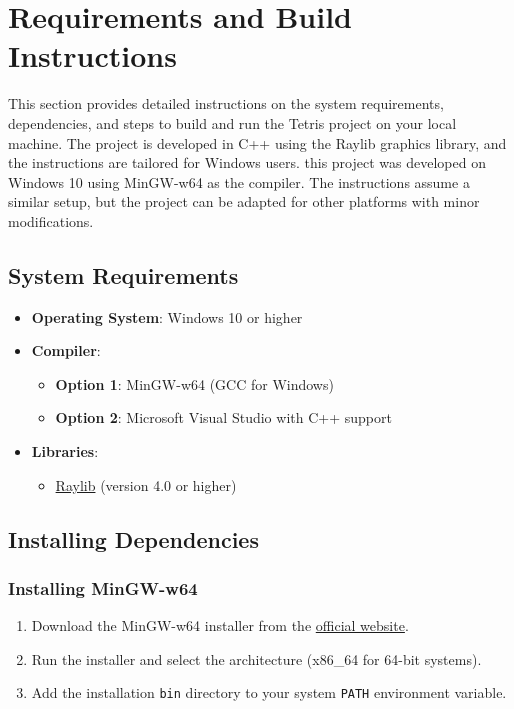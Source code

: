 \documentclass{article}
\begin{document}
\section{Requirements and Build Instructions}

This section provides detailed instructions on the system requirements, dependencies, and steps to build and run the Tetris project on your local machine. The project is developed in C++ using the Raylib graphics library, and the instructions are tailored for Windows users.
this project was developed on Windows 10 using MinGW-w64 as the compiler. The instructions assume a similar setup, but the project can be adapted for other platforms with minor modifications.
\subsection{System Requirements}

\begin{itemize}
    \item \textbf{Operating System}: Windows 10 or higher
    \item \textbf{Compiler}:
    \begin{itemize}
        \item \textbf{Option 1}: MinGW-w64 (GCC for Windows)
        \item \textbf{Option 2}: Microsoft Visual Studio with C++ support
    \end{itemize}
    \item \textbf{Libraries}:
    \begin{itemize}
        \item \href{https://www.raylib.com/}{Raylib} (version 4.0 or higher)
    \end{itemize}
\end{itemize}

\subsection{Installing Dependencies}

\subsubsection{Installing MinGW-w64}

\begin{enumerate}
    \item Download the MinGW-w64 installer from the \href{https://www.mingw-w64.org/}{official website}.
    \item Run the installer and select the architecture (x86\_64 for 64-bit systems).
    \item Add the installation \texttt{bin} directory to your system \texttt{PATH} environment variable.
\end{enumerate}
\end{document}
